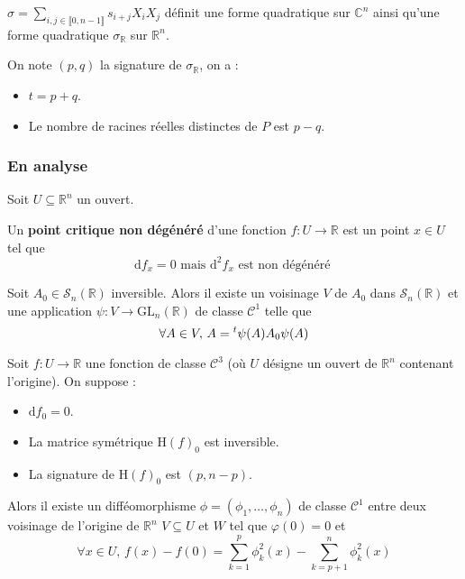 	\begin{proposition}
		$\sigma = \sum_{i, j \in \llbracket 0, n-1 \rrbracket} s_{i+j} X_i X_j$ définit une forme quadratique sur $\mathbb{C}^n$ ainsi qu'une forme quadratique $\sigma_{\mathbb{R}}$ sur $\mathbb{R}^n$.
	\end{proposition}


	\begin{theorem}
		On note $(p,q)$ la signature de $\sigma_{\mathbb{R}}$, on a :
		\begin{itemize}
			\item $t = p + q$.
			\item Le nombre de racines réelles distinctes de $P$ est $p-q$.
		\end{itemize}
	\end{theorem}

	\subsubsection{En analyse}

	Soit $U \subseteq \mathbb{R}^n$ un ouvert.


	\begin{definition}
		Un \textbf{point critique non dégénéré} d'une fonction $f : U \rightarrow \mathbb{R}$ est un point $x \in U$ tel que
		\[ \mathrm{d}f_x = 0 \text{ mais } \mathrm{d}^2f_x \text{ est non dégénéré } \]
	\end{definition}


	\begin{lemma}
		Soit $A_0 \in \mathcal{S}_n(\mathbb{R})$ inversible. Alors il existe un voisinage $V$ de $A_0$ dans $\mathcal{S}_n(\mathbb{R})$ et une application $\psi : V \rightarrow \mathrm{GL}_n(\mathbb{R})$ de classe $\mathcal{C}^1$ telle que
		\[ \forall A \in V, \, A = \mathstrut ^t \psi(A) A_0 \psi(A) \]
	\end{lemma}


	\begin{lemma}[Morse]
		Soit $f : U \rightarrow \mathbb{R}$ une fonction de classe $\mathcal{C}^3$ (où $U$ désigne un ouvert de $\mathbb{R}^n$ contenant l'origine). On suppose :
		\begin{itemize}
			\item $\mathrm{d} f_0 = 0$.
			\item La matrice symétrique $\mathrm{H} (f)_0$ est inversible.
			\item La signature de $\mathrm{H}(f)_0$ est $(p, n-p)$.
		\end{itemize}
		Alors il existe un difféomorphisme $\phi = (\phi_1, \dots, \phi_n)$ de classe $\mathcal{C}^1$ entre deux voisinage de l'origine de $\mathbb{R}^n$ $V \subseteq U$ et $W$ tel que $\varphi(0) = 0$ et
		\[ \forall x \in U, \, f(x) - f(0) = \sum_{k=1}^p \phi_k^2(x) - \sum_{k=p+1}^n \phi_k^2(x) \]
	\end{lemma}

